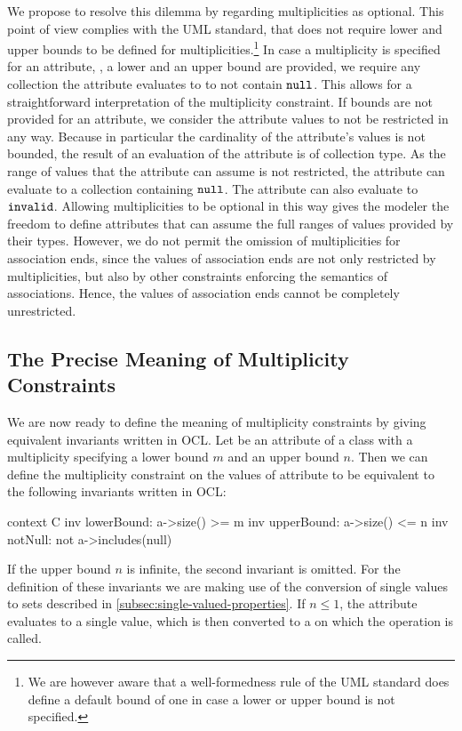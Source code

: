 We propose to resolve this dilemma by regarding multiplicities as optional. This
point of view complies with the UML standard, that does not require lower and
upper bounds to be defined for multiplicities.\footnote{We are however aware
  that a well-formedness rule of the UML standard does define a default bound
  of one in case a lower or upper bound is not specified.} In case a
multiplicity is specified for an attribute, \ie, a lower and an upper bound
are provided, we require any collection the attribute evaluates to to not
contain $\mathtt{null}$. This allows for a straightforward interpretation of
the multiplicity constraint. If bounds are not provided for an attribute, we
consider the attribute values to not be restricted in any way. Because in
particular the cardinality of the attribute's values is not bounded, the result
of an evaluation of the attribute is of collection type. As the range of values
that the attribute can assume is not restricted, the attribute can evaluate to a
collection containing $\mathtt{null}$. The attribute can also evaluate to
$\mathtt{invalid}$. Allowing multiplicities to be optional in this way gives
the modeler the freedom to define attributes that can assume the full ranges of
values provided by their types. However, we do not permit the omission of
multiplicities for association ends, since the values of association ends are
not only restricted by multiplicities, but also by other constraints enforcing
the semantics of associations. Hence, the values of association ends cannot be
completely unrestricted.

\subsection{The Precise Meaning of Multiplicity Constraints}
We are now ready to define the meaning of multiplicity constraints by giving
equivalent invariants written in OCL. Let  be an attribute of a
class  with a multiplicity specifying a lower bound $m$ and an
upper bound $n$. Then we can define the multiplicity constraint on the values of
attribute  to be equivalent to the following invariants written in
OCL:
\begin{ocl}
context C inv lowerBound: a->size() >= m
          inv upperBound: a->size() <= n
          inv notNull: not a->includes(null)
\end{ocl}
If the upper bound $n$ is infinite, the second invariant is omitted. For the
definition of these invariants we are making use of the conversion of single
values to sets described in \autoref{subsec:single-valued-properties}. If $n
\leq 1$, the attribute  evaluates to a single value, which is then
converted to a  on which the  operation is
called.

